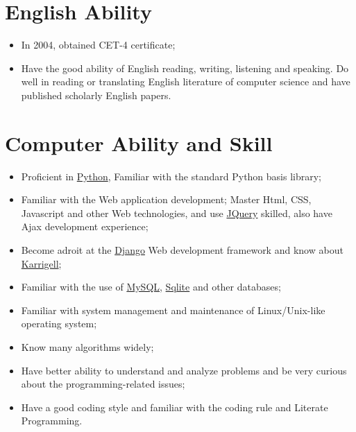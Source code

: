 \documentclass[a4paper,10pt,english]{manual}
\begin{document}
\section{English Ability}
\begin{itemize}
\item {} 
In 2004, obtained CET-4 certificate;

\item {} 
Have the good ability of English reading, writing, listening and speaking. Do well in reading or translating English literature of computer science and have published scholarly English papers.

\end{itemize}


\section{Computer Ability and Skill}
\begin{itemize}

\item {} 
Proficient in \href{http://www.python.org/}{Python}, Familiar with the standard Python basis library;

\item {} 
Familiar with the Web application development; Master Html, CSS, Javascript and other Web technologies, and  use \href{http://jquery.com}{JQuery} skilled, also have Ajax development experience;

\item {} 
Become adroit at the \href{http://www.djangoproject.com/}{Django} Web development framework and know about \href{http://karrigell.sourceforge.net/}{Karrigell};

\item {} 
Familiar with the use of \href{http://www.mysql.com}{MySQL}, \href{http://www.sqlite.org}{Sqlite} and other databases;

\item {} 
Familiar with system management and maintenance of Linux/Unix-like operating system;

\item {} 
Know many algorithms widely;

\item {} 
Have better ability to understand and analyze problems and be very curious about the programming-related issues;

\item {} 
Have a good coding style and familiar with the coding rule and Literate Programming.

\end{itemize}
\end{document}
